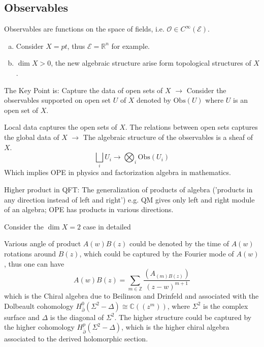 \documentclass[10pt]{article}
\begin{document}
\subsection{Observables}

Observables are functions on the space of fields, i.e. $ \mathcal{O} \in C^{\infty }(\mathcal{E})$.

\begin{example}
  \begin{enumerate}[(a)]
    \item   Consider $ X = pt$, thus $ \mathcal{E} = \mathbb{R}^{n}$ for example.
    \item $ \dim X > 0$, the new algebraic structure arise form topological structures of $ X$.
  \end{enumerate}
\end{example}

The Key Point is: Capture the data of open sets of $ X$ $\longrightarrow$ Consider the observables supported on open set $ U$  of $ X$ denoted by $ \mathrm{Obs}(U)$ where $ U$ is an open set of $ X$.

Local data captures the open sets of $ X$. The relations between open sets captures the global data of $ X$ $\longrightarrow$ The algebraic structure of the observables is a sheaf of $ X$.
\begin{equation*}
  \bigsqcup_{i} U_{i} \longrightarrow \bigotimes_{i} \mathrm{Obs}(U_i)
\end{equation*}
Which implies OPE in physics and factorization algebra in mathematics.

Higher product in QFT: The generalization of products of algebra ('products in any direction instead of left and right') e.g. QM gives only left and right module of an algebra; OPE has products in various directions.

Consider the $\dim X = 2$ case in detailed
\begin{example}
  Various angle of product $ A(w) B(z)$  could be denoted by the time of $ A(w)$ rotations around $ B(z)$, which could be captured by the Fourier mode of $ A(w)$, thus one can have
  \begin{equation*}
    A(w) B(z) = \sum_{m \in \mathbb{Z}} \frac{( A_{(m) B(z)})}{(z - w)^{m+1}}
  \end{equation*}
  which is the Chiral algebra due to Beilinson and Drinfeld and associated with the Dolbeault cohomology $ H^{0}_{\bar{ \partial }}(\Sigma^{2} - \Delta) \cong \mathbb{C}((z^{m}))$, where $ \Sigma^{2}$ is the complex surface and $ \Delta$ is the diagonal of $ \Sigma^{2}$. The higher structure could be captured by the higher cohomology $ H^{p}_{\bar{ \partial }}(\Sigma^{2} - \Delta)$, which is the higher chiral algebra associated to the derived holomorphic section.
\end{example}
\end{document}
